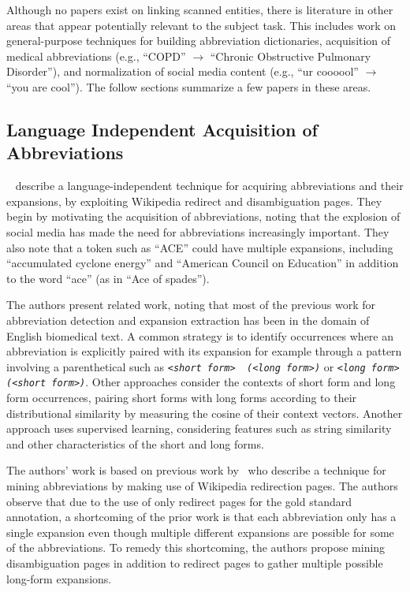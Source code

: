 \documentclass[11pt,a4paper]{article}
\begin{document}
Although no papers exist on linking scanned entities, there is
literature in other areas that appear potentially relevant to the
subject task.  This includes work on general-purpose techniques for
building abbreviation dictionaries, acquisition of medical
abbreviations (e.g., ``COPD'' $\rightarrow$ ``Chronic Obstructive Pulmonary
Disorder''), and normalization of social media content (e.g., ``ur
coooool'' $\rightarrow$ ``you are cool'').  The follow sections
summarize a few papers in these areas.

\subsection{Language Independent Acquisition of Abbreviations}
~\cite{DBLP:journals/corr/abs-1709-08074} describe a
language-independent technique for acquiring abbreviations and their
expansions, by exploiting Wikipedia redirect and disambiguation pages.
They begin by motivating the acquisition of abbreviations, noting that
the explosion of social media has made the need for abbreviations
increasingly important.  They also note that a token such as ``ACE''
could have multiple expansions, including ``accumulated cyclone
energy'' and ``American Council on Education'' in addition to the word
``ace'' (as in ``Ace of spades'').

The authors present related work, noting that most of the previous
work for abbreviation detection and expansion extraction has been in
the domain of English biomedical text.  A common strategy is to
identify occurrences where an abbreviation is explicitly paired with
its expansion for example through a pattern involving a parenthetical
such as {\em \verb|<short form>  (<long form>)|} or {\em
  \verb|<long form> (<short form>)|}.
Other approaches consider the contexts of short form and long form
occurrences, pairing short forms with long forms according to their
distributional similarity by measuring the cosine of their context
vectors.  Another approach uses supervised learning, considering
features such as string similarity and other characteristics of the
short and long forms.

The authors' work is based on previous work by~\cite{JACQUET14.468}
who describe a technique for mining abbreviations by making use of
Wikipedia redirection pages.  The authors observe that due to the use
of only redirect pages for the gold standard annotation, a shortcoming
of the prior work is that each abbreviation only has a single
expansion even though multiple different expansions are possible for
some of the abbreviations.  To remedy this shortcoming, the authors
propose mining disambiguation pages in addition to redirect pages to
gather multiple possible long-form expansions.
\end{document}

